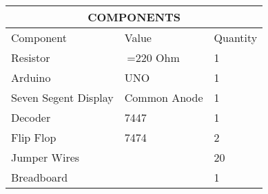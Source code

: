 \begin{tabular}{|p{5cm}|p{3cm}|p{2cm}|}
\hline
\multicolumn{3}{|c|}{COMPONENTS}\\
\hline
Component& Value& Quantity\\
\hline
Resistor& $\>$=220 Ohm& 1\\
\hline
Arduino& UNO& 1\\
\hline
Seven Segent Display& Common Anode& 1\\
\hline
Decoder& 7447& 1\\
\hline
Flip Flop& 7474& 2\\
\hline
Jumper Wires&  & 20\\
\hline
Breadboard&  & 1\\
\hline
\end{tabular}
